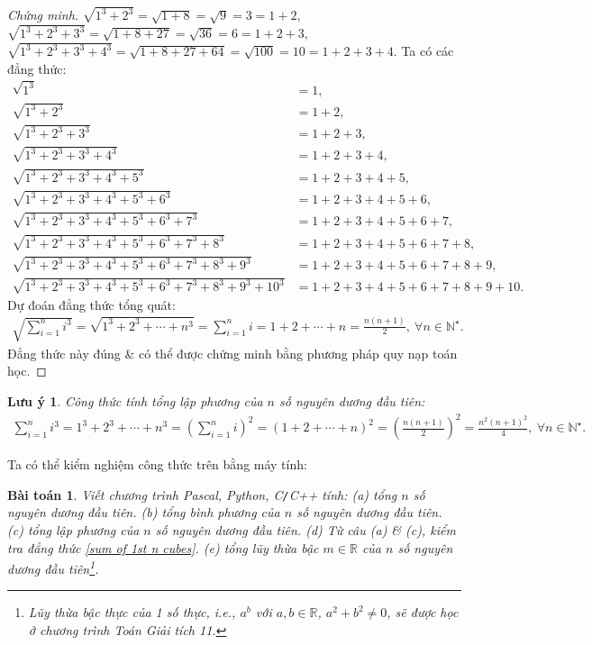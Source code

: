 \documentclass{article}
\newtheorem{baitoan}{Bài toán}
\newtheorem{luuy}{Lưu ý}
\begin{document}
\begin{proof}[Chứng minh]
	$\sqrt{1^3 + 2^3} = \sqrt{1 + 8} = \sqrt{9} = 3 = 1 + 2$, $\sqrt{1^3 + 2^3 + 3^3} = \sqrt{1 + 8 + 27} = \sqrt{36} = 6 = 1 + 2 + 3$, $\sqrt{1^3 + 2^3 + 3^3 + 4^3} = \sqrt{1 + 8 + 27 + 64} = \sqrt{100} = 10 = 1 + 2 + 3 + 4$. Ta có các đẳng thức:
	\begin{align*}
		\sqrt{1^3} &= 1,\\
		\sqrt{1^3 + 2^3} &= 1 + 2,\\
		\sqrt{1^3 + 2^3 + 3^3} &= 1 + 2 + 3,\\
		\sqrt{1^3 + 2^3 + 3^3 + 4^3} &= 1 + 2 + 3 + 4,\\
		\sqrt{1^3 + 2^3 + 3^3 + 4^3 + 5^3} &= 1 + 2 + 3 + 4 + 5,\\
		\sqrt{1^3 + 2^3 + 3^3 + 4^3 + 5^3 + 6^3} &= 1 + 2 + 3 + 4 + 5 + 6,\\
		\sqrt{1^3 + 2^3 + 3^3 + 4^3 + 5^3 + 6^3 + 7^3} &= 1 + 2 + 3 + 4 + 5 + 6 + 7,\\
		\sqrt{1^3 + 2^3 + 3^3 + 4^3 + 5^3 + 6^3 + 7^3 + 8^3} &= 1 + 2 + 3 + 4 + 5 + 6 + 7 + 8,\\
		\sqrt{1^3 + 2^3 + 3^3 + 4^3 + 5^3 + 6^3 + 7^3 + 8^3 + 9^3} &= 1 + 2 + 3 + 4 + 5 + 6 + 7 + 8 + 9,\\
		\sqrt{1^3 + 2^3 + 3^3 + 4^3 + 5^3 + 6^3 + 7^3 + 8^3 + 9^3 + 10^3} &= 1 + 2 + 3 + 4 + 5 + 6 + 7 + 8 + 9 + 10.
	\end{align*}
	Dự đoán đẳng thức tổng quát:
	\begin{align*}
		\sqrt{\sum_{i=1}^n i^3} = \sqrt{1^3 + 2^3 + \cdots + n^3} = \sum_{i=1}^n i = 1 + 2 + \cdots + n = \frac{n(n + 1)}{2},\ \forall n\in\mathbb{N}^\star.
	\end{align*}
	Đẳng thức này đúng \& có thể được chứng minh bằng phương pháp quy nạp toán học.
\end{proof}

\begin{luuy}
	Công thức tính tổng lập phương của $n$ số nguyên dương đầu tiên:
	\begin{align}
		\label{sum of 1st n cubes}
		\sum_{i=1}^n i^3 = 1^3 + 2^3 + \cdots + n^3 = \left(\sum_{i=1}^n i\right)^2 = (1 + 2 + \cdots + n)^2 = \left(\frac{n(n + 1)}{2}\right)^2 = \frac{n^2(n + 1)^2}{4},\ \forall n\in\mathbb{N}^\star.
	\end{align}
\end{luuy}
Ta có thể kiểm nghiệm công thức trên bằng máy tính:

\begin{baitoan}
	Viết chương trình {\sf Pascal, Python, C\texttt{/}C++} tính: (a) tổng $n$ số nguyên dương đầu tiên. (b) tổng bình phương của $n$ số nguyên dương đầu tiên. (c) tổng lập phương của $n$ số nguyên dương đầu tiên. (d) Từ câu (a) \& (c), kiểm tra đẳng thức \eqref{sum of 1st n cubes}. (e) tổng lũy thừa bậc $m\in\mathbb{R}$ của $n$ số nguyên dương đầu tiên\footnote{Lũy thừa bậc thực của 1 số thực, i.e., $a^b$ với $a,b\in\mathbb{R}$, $a^2 + b^2\ne0$, sẽ được học ở chương trình Toán Giải tích 11.}.
\end{baitoan}
\end{document}

